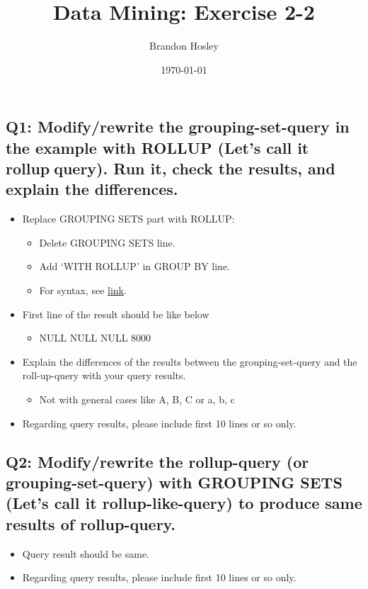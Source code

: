 \documentclass[]{article}
\title{Data Mining: Exercise 2-2}
\author{Brandon Hosley}
\date{\today}
\begin{document}
\maketitle


\subsection*{Q1: Modify/rewrite the grouping-set-query in the example with ROLLUP (Let’s call it rollup￾query). Run it, check the results, and explain the differences.}

\begin{itemize}
	\item Replace GROUPING SETS part with ROLLUP:
	\begin{itemize}
		\item Delete GROUPING SETS line.
		\item Add ‘WITH ROLLUP’ in GROUP BY line.
		\item For syntax, see \href{https://cwiki.apache.org/confluence/display/Hive/Enhanced+Aggregation\%2C+Cube\%2C+Grouping+and+Rollup}{link}.
	\end{itemize}
	\item First line of the result should be like below
	\begin{itemize}
		\item NULL NULL NULL 8000
	\end{itemize}
	\item Explain the differences of the results between the grouping-set-query and the roll-up-query with your query results. 
	\begin{itemize}
		\item Not with general cases like A, B, C or a, b, c 
	\end{itemize}
	\item Regarding query results, please include first 10 lines or so only.
\end{itemize}

\subsection*{Q2: Modify/rewrite the rollup-query (or grouping-set-query) with GROUPING SETS (Let’s call it rollup-like-query) to produce same results of rollup-query.}

\begin{itemize}
	\item Query result should be same.
	\item Regarding query results, please include first 10 lines or so only.
\end{itemize}
\end{document}
